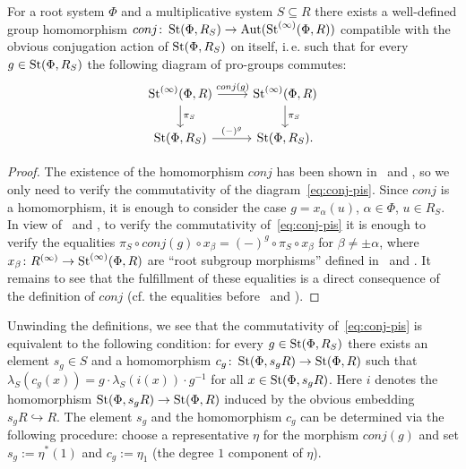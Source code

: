 \documentclass[oneside, 11pt]{amsart} \pdfoutput=1
\begin{document}
\begin{prop}\label{prop:conj-action}
 For a root system $\Phi$ and a multiplicative system $S\subseteq R$ there exists a well-defined group homomorphism $conj\colon \mathop{\mathrm{St}}\nolimits(\Phi, R_S) \to \mathrm{Aut}(\mathop{\mathrm{St}}\nolimits^{(\infty)}(\Phi, R))$ compatible with the obvious conjugation action of $\mathop{\mathrm{St}}\nolimits(\Phi, R_S)$ on itself, i.\,e. such that for every $g \in \mathop{\mathrm{St}}\nolimits(\Phi, R_S)$ the following diagram of pro-groups commutes:
 \begin{equation} \label{eq:conj-pis} \begin{tikzcd} \St^{(\infty)}(\Phi, R) \ar{r}{conj(g)} \ar{d}{\pi_S} & \St^{(\infty)}(\Phi, R) \ar{d}{\pi_S} \\ \St(\Phi, R_S) \ar{r}{(-)^g} & \St(\Phi, R_S). \end{tikzcd} \end{equation}
\end{prop}
\begin{proof}
The existence of the homomorphism $conj$ has been shown in~\cite[Proposition~4.2]{LSV20} and \cite[beginning of \S 10]{V20}, so we only need to verify the commutativity of the diagram~\eqref{eq:conj-pis}. 
Since $conj$ is a homomorphism, it is enough to consider the case $g = x_\alpha(u)$, $\alpha \in \Phi$, $u \in R_S$.
In view of~\cite[Lemma~3.2]{LSV20} and \cite[Lemma~11]{V20}, to verify the commutativity of~\eqref{eq:conj-pis} it is enough to verify the equalities $\pi_S \circ conj(g) \circ x_\beta= (-)^g \circ \pi_S \circ x_\beta$ for $\beta\neq \pm\alpha$, where $x_\beta\colon R^{(\infty)} \to \mathop{\mathrm{St}}\nolimits^{(\infty)}(\Phi, R)$ are ``root subgroup morphisms'' defined in~\cite[\S~2.4]{LSV20} and \cite[\S 5]{V20}.
It remains to see that the fulfillment of these equalities is a direct consequence of the definition of $conj$ (cf. the equalities before~\cite[Proposition~4.2]{LSV20} and \cite[S~10]{V20}). \end{proof}
\begin{rem} \label{rem:conj-action}
Unwinding the definitions, we see that the commutativity of~\eqref{eq:conj-pis} is equivalent to the following condition: for every $g\in \mathop{\mathrm{St}}\nolimits(\Phi, R_S)$ there exists an element $s_g\in S$ and a homomorphism $c_g \colon \mathop{\mathrm{St}}\nolimits(\Phi, s_g R) \to \mathop{\mathrm{St}}\nolimits(\Phi, R)$ such that $\lambda_S(c_g(x)) = g \cdot \lambda_S(i(x))\cdot g^{-1}$ for all $x\in \mathop{\mathrm{St}}\nolimits(\Phi, s_g R)$. Here $i$ denotes the homomorphism $\mathop{\mathrm{St}}\nolimits(\Phi, s_g R) \to \mathop{\mathrm{St}}\nolimits(\Phi, R)$ induced by the obvious embedding $s_gR \hookrightarrow R$. The element $s_g$ and the homomorphism $c_g$ can be determined via the following procedure: choose a representative $\eta$ for the morphism $conj(g)$ and set $s_g := \eta^*(1)$ and $c_g := \eta_1$ (the degree $1$ component of $\eta$).
\end{rem}
\end{document}

